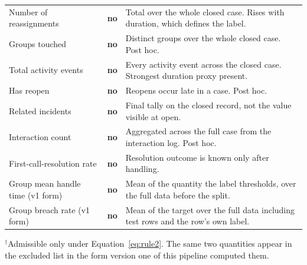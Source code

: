 \begin{table}[htbp]
\begin{tabular}{L{4.0cm} c L{8.4cm}}
\midrule
Number of reassignments & \textbf{no} & Total over the whole closed case. Rises with duration, which defines the label. \\
Groups touched & \textbf{no} & Distinct groups over the whole closed case. Post hoc. \\
Total activity events & \textbf{no} & Every activity event across the closed case. Strongest duration proxy present. \\
Has reopen & \textbf{no} & Reopens occur late in a case. Post hoc. \\
Related incidents & \textbf{no} & Final tally on the closed record, not the value visible at open. \\
Interaction count & \textbf{no} & Aggregated across the full case from the interaction log. Post hoc. \\
First-call-resolution rate & \textbf{no} & Resolution outcome is known only after handling. \\
Group mean handle time (v1 form) & \textbf{no} & Mean of the quantity the label thresholds, over the full data before the split. \\
Group breach rate (v1 form) & \textbf{no} & Mean of the target over the full data including test rows and the row's own label. \\
\bottomrule
\end{tabular}

\vspace{0.4em}
{\footnotesize $^{\dagger}$Admissible only under Equation~\ref{eq:rule2}. The same two
quantities appear in the excluded list in the form version one of this pipeline computed them.}
\end{table}
